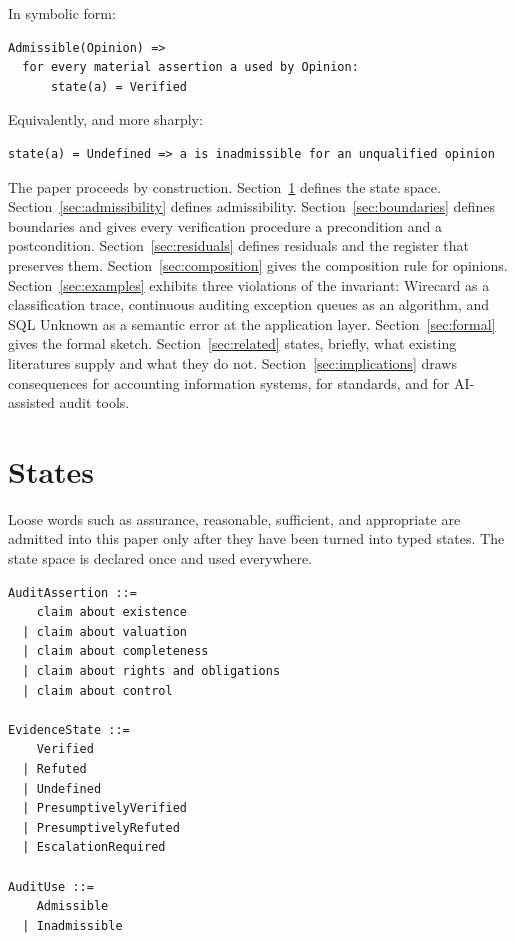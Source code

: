 \documentclass[smallcondensed,envcountsect,natbib]{svjour3}
\newcommand{\state}[1]{\textsf{#1}}
\begin{document}
In symbolic form:

\begin{lstlisting}
Admissible(Opinion) =>
  for every material assertion a used by Opinion:
      state(a) = Verified
\end{lstlisting}

Equivalently, and more sharply:

\begin{lstlisting}
state(a) = Undefined => a is inadmissible for an unqualified opinion
\end{lstlisting}

The paper proceeds by construction. Section~\ref{sec:states} defines the state space. Section~\ref{sec:admissibility} defines admissibility. Section~\ref{sec:boundaries} defines boundaries and gives every verification procedure a precondition and a postcondition. Section~\ref{sec:residuals} defines residuals and the register that preserves them. Section~\ref{sec:composition} gives the composition rule for opinions. Section~\ref{sec:examples} exhibits three violations of the invariant: Wirecard as a classification trace, continuous auditing exception queues as an algorithm, and SQL \state{Unknown} as a semantic error at the application layer. Section~\ref{sec:formal} gives the formal sketch. Section~\ref{sec:related} states, briefly, what existing literatures supply and what they do not. Section~\ref{sec:implications} draws consequences for accounting information systems, for standards, and for AI-assisted audit tools.

\section{States}
\label{sec:states}

Loose words such as assurance, reasonable, sufficient, and appropriate are admitted into this paper only after they have been turned into typed states. The state space is declared once and used everywhere.

\begin{lstlisting}
AuditAssertion ::=
    claim about existence
  | claim about valuation
  | claim about completeness
  | claim about rights and obligations
  | claim about control

EvidenceState ::=
    Verified
  | Refuted
  | Undefined
  | PresumptivelyVerified
  | PresumptivelyRefuted
  | EscalationRequired

AuditUse ::=
    Admissible
  | Inadmissible
\end{lstlisting}
\end{document}
